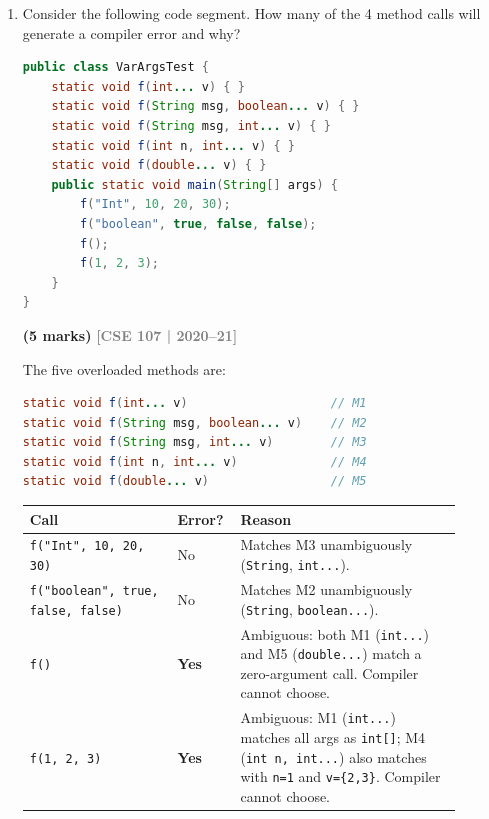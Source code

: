 \documentclass[12pt,a3paper]{article}
\newcommand{\yr}[1]{\hfill\textcolor{gray}{\small\textbf{[#1]}}}
\newcommand{\mk}[1]{\textcolor{orange!70!black}{\small\textbf{(#1 marks)}}}
\begin{document}
\begin{enumerate}
\item Consider the following code segment. How many of the 4 method calls will generate a compiler error and why?
\begin{lstlisting}[language=Java]
public class VarArgsTest {
    static void f(int... v) { }
    static void f(String msg, boolean... v) { }
    static void f(String msg, int... v) { }
    static void f(int n, int... v) { }
    static void f(double... v) { }
    public static void main(String[] args) {
        f("Int", 10, 20, 30);
        f("boolean", true, false, false);
        f();
        f(1, 2, 3);
    }
}
\end{lstlisting}
\mk{5}
\yr{CSE 107 | 2020--21}

\begin{tcolorbox}[enhanced,breakable,ansbox,
  colback=cB!4,colframe=cB,boxrule=0.8pt,arc=5pt,
  title={\textbf{Answer --- \texttt{VarArgsTest}: Compiler Errors}},
  fonttitle=\bfseries\color{white},colbacktitle=cB]

The five overloaded methods are:

\begin{lstlisting}[language=Java]
static void f(int... v)                    // M1
static void f(String msg, boolean... v)    // M2
static void f(String msg, int... v)        // M3
static void f(int n, int... v)             // M4
static void f(double... v)                 // M5
\end{lstlisting}

\begin{center}
\small
\begin{tabular}{@{}p{0.32\linewidth}p{0.1\linewidth}p{0.48\linewidth}@{}}
\toprule
\textbf{Call} & \textbf{Error?} & \textbf{Reason} \\
\midrule
\texttt{f("Int", 10, 20, 30)} & No &
  Matches M3 unambiguously (\texttt{String}, \texttt{int...}). \\[4pt]
\texttt{f("boolean", true, false, false)} & No &
  Matches M2 unambiguously (\texttt{String}, \texttt{boolean...}). \\[4pt]
\texttt{f()} & \textbf{Yes} &
  Ambiguous: both M1 (\texttt{int...}) and M5 (\texttt{double...})
  match a zero-argument call.  Compiler cannot choose. \\[4pt]
\texttt{f(1, 2, 3)} & \textbf{Yes} &
  Ambiguous: M1 (\texttt{int...}) matches all args as \texttt{int[]};
  M4 (\texttt{int n, int...}) also matches with \texttt{n=1} and
  \texttt{v=\{2,3\}}.  Compiler cannot choose. \\
\bottomrule
\end{tabular}
\end{center}


\end{tcolorbox}
\end{enumerate}
\end{document}
